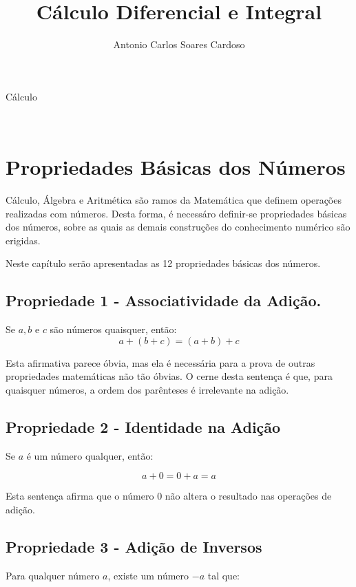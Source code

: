 \documentclass[
    12pt, %
    openright,
    twoside, %
    a4paper, %
    article,
    english,brazil %
]{abntex2}
\author{Antonio Carlos Soares Cardoso}
\title{Cálculo Diferencial e Integral}
\makeatletter
\renewcommand\tableofcontents{%
  \null\hfill\textbf{\Large\contentsname}\hfill\null\par
  \@mkboth{\MakeUppercase\contentsname}{\MakeUppercase\contentsname}%
  \@starttoc{toc}%
}
\makeatother
\begin{document}
\begin{capa}
    \center
    \ABNTEXchapterfont\Large Cálculo\\
    \vspace*{1cm}
    {\ABNTEXchapterfont\large\imprimirautor}
    \vfill
    \begin{center}
    \ABNTEXchapterfont\bfseries\LARGE\imprimirtitulo
    \end{center}
    \vfill
    \large\imprimirlocal \\
    \large\imprimirdata
    \vspace*{1cm}
\end{capa}

\tableofcontents

\newpage

\textual

\section{Propriedades Básicas dos Números}

Cálculo, Álgebra e Aritmética são ramos da Matemática que definem operações realizadas com números. Desta forma, é necessáro definir-se propriedades básicas dos números, sobre as quais as demais construções do conhecimento numérico são erigidas. 

Neste capítulo serão apresentadas as 12 propriedades básicas dos números.

\subsection{Propriedade 1 - Associatividade da Adição.}
Se $a,b$ e $c$ são números quaisquer, então: 
$$ a+(b+c)=(a+b)+c $$

Esta afirmativa parece óbvia, mas ela é necessária para a prova de outras propriedades matemáticas não tão óbvias. O cerne desta sentença é que, para quaisquer números, a ordem dos parênteses é irrelevante na adição. 

\subsection{Propriedade 2 - Identidade na Adição}
Se $a$ é um número qualquer, então: 

$$a+0=0+a=a$$

Esta sentença afirma que o número $0$ não altera o resultado nas operações de adição.

\subsection{Propriedade 3 - Adição de Inversos}
Para qualquer número $a$, existe um número $-a$ tal que: 
\end{document}
